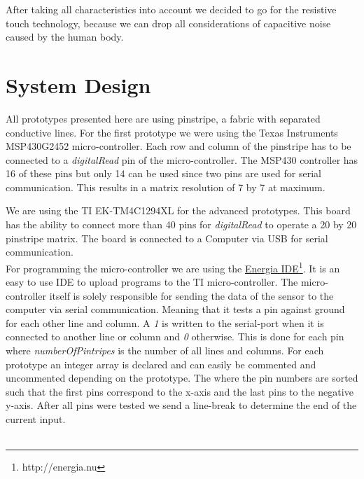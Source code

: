 After taking all characteristics into account we decided to go for the resistive touch technology, because we can drop all considerations of capacitive noise caused by the human body. 

\section{System Design}
All prototypes presented here are using pinstripe, a fabric with separated conductive lines. For the first prototype we were using the Texas Instruments MSP430G2452 micro-controller. Each row and column of the pinstripe has to be connected to a \emph{digitalRead} pin of the micro-controller. The MSP430 controller has 16 of these pins but only 14 can be used since two pins are used for serial communication. This results in a matrix resolution of 7 by 7 at maximum. 
\medskip
{}

We are using the TI EK-TM4C1294XL for the advanced prototypes. This board has the ability to connect more than 40 pins for \emph{digitalRead} to operate a 20 by 20 pinstripe matrix. The board is connected to a Computer via USB for serial communication.\\

For programming the micro-controller we are using the \href{http://energia.nu}{Energia IDE}\footnote{http://energia.nu}. It is an easy to use IDE to upload programs to the TI micro-controller. The micro-controller itself is solely responsible for sending the data of the sensor to the computer via serial communication. Meaning that it tests a pin against ground for each other line and column. A \emph{1} is written to the serial-port when it is connected to another line or column and \emph{0} otherwise. This is done for each pin where \emph{numberOfPintripes} is the number of all lines and columns. For each prototype an integer array is declared and can easily be commented and uncommented depending on the prototype. The where the pin numbers are sorted such that the first pins correspond to the x-axis and the last pins to the negative y-axis. After all pins were tested we send a line-break to determine the end of the current input.\\  \\


